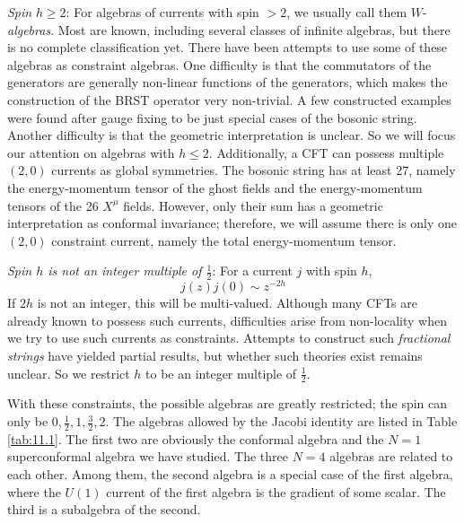 \emph{Spin} $h\geq 2$: For algebras of currents with spin $>2$, we usually call them $W$-\emph{algebras}. Most are known, including several classes of infinite algebras, but there is no complete classification yet. There have been attempts to use some of these algebras as constraint algebras. One difficulty is that the commutators of the generators are generally non-linear functions of the generators, which makes the construction of the BRST operator very non-trivial. A few constructed examples were found after gauge fixing to be just special cases of the bosonic string. Another difficulty is that the geometric interpretation is unclear. So we will focus our attention on algebras with $h\leq 2$. Additionally, a CFT can possess multiple $(2,0)$ currents as global symmetries. The bosonic string has at least 27, namely the energy-momentum tensor of the ghost fields and the energy-momentum tensors of the 26 $X^{\mu}$ fields. However, only their sum has a geometric interpretation as conformal invariance; therefore, we will assume there is only one $(2,0)$ constraint current, namely the total energy-momentum tensor.

\emph{Spin $h$ is not an integer multiple of $\frac{1}{2}$}: For a current $j$ with spin $h$,
\begin{equation}
	j(z)j(0)\sim z^{-2h} \label{11.1.1}
\end{equation}
If $2h$ is not an integer, this will be multi-valued. Although many CFTs are already known to possess such currents, difficulties arise from non-locality when we try to use such currents as constraints. Attempts to construct such \emph{fractional strings} have yielded partial results, but whether such theories exist remains unclear. So we restrict $h$ to be an integer multiple of $\frac{1}{2}$.

With these constraints, the possible algebras are greatly restricted; the spin can only be $0, \frac{1}{2}, 1, \frac{3}{2}, 2$. The algebras allowed by the Jacobi identity are listed in Table \ref{tab:11.1}. The first two are obviously the conformal algebra and the $N=1$ superconformal algebra we have studied. The three $N=4$ algebras are related to each other. Among them, the second algebra is a special case of the first algebra, where the $U(1)$ current of the first algebra is the gradient of some scalar. The third is a subalgebra of the second.


